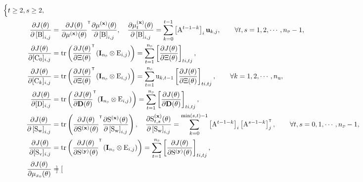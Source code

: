 \begin{align}
\begin{cases}
             t\geq 2,s\geq 2, \label{eq:J derivative A3}\\
        \end{cases}\\
        \pdv{J(\vctheta)}{\left[ \mxB \right]_{i,j}} &=  \pdv{J(\vctheta)}{\mu^{(\mathbf{x})}(\vctheta)}^\tr \pdv{\mu^{(\mathbf{x})}(\vctheta)}{\left[\mxB \right]_{i,j}}, \quad \pdv{\mu^{(\mathbf{x})}_t(\vctheta)}{\left[\mxB \right]_{i,j}} = \sum_{k=0}^{t-1} \left[\mxA^{t-1-k} \right]_i \mathbf{u}_{k,j}, \qquad \forall t,s = 1,2,\cdots,\nD-1, \label{eq:J derivative B}\\
        \pdv{J(\vctheta)}{[\mxC_0]_{i,j}} &= \trace \left( \pdv{J(\vctheta)}{\Xi(\vctheta)}^\tr \left( \mathbf{I}_{\nsD} \otimes \mxE_{i,j} \right) \right)
        = \sum_{t=1}^\nsD \left[ \pdv{J(\vctheta)}{\Xi(\vctheta)} \right]_{ti,tj}, \label{eq:J derivative C0}\\
        \pdv{J(\vctheta)}{[\mxC_k]_{i,j}} &= \trace \left( \pdv{J(\vctheta)}{\Xi(\vctheta)}^\tr \left( \mathbf{I}_{\nsD} \otimes \mxE_{i,j} \right) \right)
        = \sum_{t=1}^\nsD \vcu_{k,t-1} \left[ \pdv{J(\vctheta)}{\Xi(\vctheta)} \right]_{ti,tj}, \qquad \forall k = 1,2,\cdots,\Nu, \label{eq:J derivative Ci}\\
        \pdv{J(\vctheta)}{[\mxD]_{i,j}} &= \trace\left(\pdv{J(\vctheta)}{\mathbf{D}(\vctheta)}^\tr \left( \mathbf{I}_{\nsD} \otimes \mxE_{i,j} \right) \right)
         = \sum_{t=1}^\nsD \left[ \pdv{J(\vctheta)}{\mathbf{D}(\vctheta)} \right]_{ti,tj}, \label{eq:J derivative D}\\
        \pdv{J(\vctheta)}{\left[\mxS_\vcw \right]_{i,j}} &= \trace \left( \pdv{J(\vctheta)}{\mxS^{(\mathbf{x})}(\vctheta)}^\tr \pdv{\mxS^{(\mathbf{x})}(\vctheta)}{\left[ \mxS_\vcw \right]_{i,j}} \right), \quad \pdv{\mxS^{(\mathbf{x})}_{t,s}(\vctheta)}{\left[ \mxS_\vcw \right]_{i,j}} = \sum_{k=0}^{\min(s,t)-1} \left[\mxA^{t-1-k}\right]_i \left[\mxA^{s-1-k}\right]_j^\tr,\qquad \forall t,s = 0,1,\cdots,\nD-1, \label{eq:J derivative Sw}\\
        \pdv{J(\vctheta)}{[\mxS_\vcv]_{i,j}} &= \trace\left(\pdv{J(\vctheta)}{\mxS^{(\mathbf{y})}(\vctheta)}^\tr \left( \mathbf{I}_{\nsD} \otimes \mxE_{i,j} \right) \right)
         = \sum_{t=1}^\nsD \left[ \pdv{J(\vctheta)}{\mxS^{(\mathbf{y})}(\vctheta)} \right]_{ti,tj}, \label{eq:J derivative Sv}\\
        \pdv{J(\vctheta)}{ \mu_{x_0}(\vctheta) } &= \begin{bmatrix}

\end{bmatrix}
\end{align}
